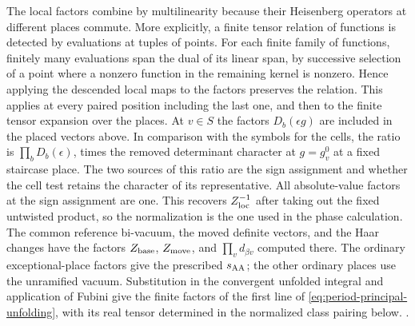The local factors combine by multilinearity because their
Heisenberg operators at different places commute. More
explicitly, a finite tensor relation of functions is detected
by evaluations at tuples of points. For each finite family of
functions, finitely many evaluations span the dual of its
linear span, by successive selection of a point where a
nonzero function in the remaining kernel is nonzero. Hence
applying the descended local maps to the factors preserves the
relation. This applies at every paired position including the
last one, and then to the finite tensor expansion over the
places. At \(v\in S\) the factors \(D_b(\epsilon g)\) are
included in the placed vectors above. In comparison with the
symbols for the cells, the ratio is
\(\prod_bD_b(\epsilon)\), times the removed determinant
character at \(g=g_v^0\) at a fixed staircase place. The
two sources of this ratio are the sign assignment and whether
the cell test retains the character of its representative.
All absolute-value factors at the sign assignment are one.
This recovers \(Z_{\rm loc}^{-1}\) after taking out the fixed
untwisted product, so the normalization is the one used in
the phase calculation. The common reference bi-vacuum,
the moved definite vectors, and the Haar changes have the
factors \(Z_{\rm base}\), \(Z_{\rm move}\), and
\(\prod_v d_{\beta v}\) computed there. The ordinary exceptional-place factors give the prescribed
\(s_{\rm AA}\); the other ordinary places use the
unramified vacuum. Substitution in the convergent unfolded
integral and application of Fubini give the finite factors of
the first line of \eqref{eq:period-principal-unfolding}, with its
real tensor determined in the normalized class pairing below.
.

